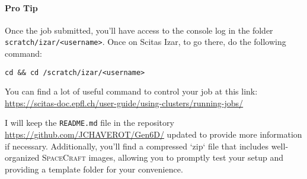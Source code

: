 \bigskip

\paragraph{Pro Tip} Once the job submitted, you'll have access to the console log in the folder \texttt{scratch/izar/<username>}. Once on Scitas Izar, to go there, do the following command:
{ \captionsetup{labelformat=empty,labelsep=none}
\begin{lstlisting}[style=bashstyle, caption=\null]
cd && cd /scratch/izar/<username>
\end{lstlisting}
}

\bigskip

\noindent You can find a lot of useful command to control your job at this link: \url{https://scitas-doc.epfl.ch/user-guide/using-clusters/running-jobs/}

\bigskip

\noindent I will keep the \texttt{README.md} file in the repository \url{https://github.com/JCHAVEROT/Gen6D/} updated to provide more information if necessary. Additionally, you'll find a compressed `zip` file that includes well-organized \textsc{SpaceCraft} images, allowing you to promptly test your setup and providing a template folder for your convenience.


\cleardoublepage{}